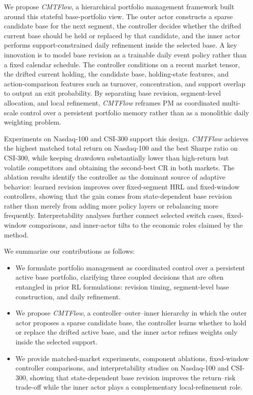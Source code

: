 \documentclass[letterpaper]{article} %
\begin{document}
We propose \textit{CMTFlow}, a hierarchical portfolio management framework built around this stateful base-portfolio view. The outer actor constructs a sparse candidate base for the next segment, the controller decides whether the drifted current base should be held or replaced by that candidate, and the inner actor performs support-constrained daily refinement inside the selected base. A key innovation is to model base revision as a trainable daily event policy rather than a fixed calendar schedule. The controller conditions on a recent market tensor, the drifted current holding, the candidate base, holding-state features, and action-comparison features such as turnover, concentration, and support overlap to output an exit probability. By separating base revision, segment-level allocation, and local refinement, \textit{CMTFlow} reframes PM as coordinated multi-scale control over a persistent portfolio memory rather than as a monolithic daily weighting problem.

Experiments on Nasdaq-100 and CSI-300 support this design. \textit{CMTFlow} achieves the highest matched total return on Nasdaq-100 and the best Sharpe ratio on CSI-300, while keeping drawdown substantially lower than high-return but volatile competitors and obtaining the second-best CR in both markets. The ablation results identify the controller as the dominant source of adaptive behavior: learned revision improves over fixed-segment HRL and fixed-window controllers, showing that the gain comes from state-dependent base revision rather than merely from adding more policy layers or rebalancing more frequently. Interpretability analyses further connect selected switch cases, fixed-window comparisons, and inner-actor tilts to the economic roles claimed by the method.

We summarize our contributions as follows:
\begin{itemize}
    \item We formulate portfolio management as coordinated control over a persistent active base portfolio, clarifying three coupled decisions that are often entangled in prior RL formulations: revision timing, segment-level base construction, and daily refinement.
    \item We propose \textit{CMTFlow}, a controller--outer--inner hierarchy in which the outer actor proposes a sparse candidate base, the controller learns whether to hold or replace the drifted active base, and the inner actor refines weights only inside the selected support.
    \item We provide matched-market experiments, component ablations, fixed-window controller comparisons, and interpretability studies on Nasdaq-100 and CSI-300, showing that state-dependent base revision improves the return--risk trade-off while the inner actor plays a complementary local-refinement role.
\end{itemize}
\end{document}
